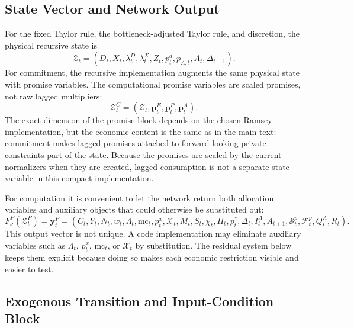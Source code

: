 ﻿\documentclass[12pt]{article}
\theoremstyle{remark}
\newcommand{\mc}{\mathrm{mc}}
\begin{document}
\subsection{State Vector and Network Output}

For the fixed Taylor rule, the bottleneck-adjusted Taylor rule, and discretion, the physical
recursive state is
\begin{equation}
    \mathcal Z_t
    =
    (D_t,X_t,\lambda_t^D,\lambda_t^X,Z_t,p_t^d,p_{A,t},A_t,\Delta_{t-1}).
    \label{eq:app_deqn_state}
\end{equation}
For commitment, the recursive implementation augments the same physical state with promise
variables. The computational promise variables are scaled promises, not raw lagged multipliers:
\begin{equation}
    \mathcal Z_t^C
    =
    (\mathcal Z_t,\mathbf p_t^{E},\mathbf p_t^{P},\mathbf p_t^{A}).
    \label{eq:app_deqn_commitment_state}
\end{equation}
The exact dimension of the promise block depends on the chosen Ramsey implementation, but the
economic content is the same as in the main text: commitment makes lagged promises attached to
forward-looking private constraints part of the state. Because the promises are scaled by the
current normalizers when they are created, lagged consumption is not a separate state variable in
this compact implementation.

For computation it is convenient to let the network return both allocation variables and auxiliary
objects that could otherwise be substituted out:
\begin{equation}
    F_\nu^P(\mathcal Z_t^P)
    =
    \mathbf y_t^P
    =
    (C_t,Y_t,N_t,w_t,\Lambda_t,\mc_t,p_t^x,\mathcal X_t,M_t,S_t,
    \chi_t,\Pi_t,p_t^*,\Delta_t,I_t^A,A_{t+1},
    \mathcal S_t^p,\mathcal F_t^p,Q_t^A,R_t).
    \label{eq:app_deqn_output_vector}
\end{equation}
This output vector is not unique. A code implementation may eliminate auxiliary variables such as
$\Lambda_t$, $p_t^x$, $\mc_t$, or $\mathcal X_t$ by substitution. The residual system below keeps
them explicit because doing so makes each economic restriction visible and easier to test.

\subsection{Exogenous Transition and Input-Condition Block}
\end{document}
